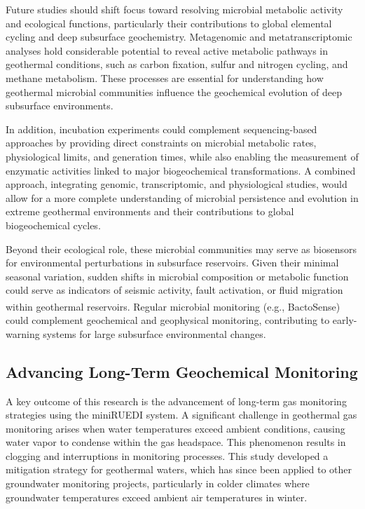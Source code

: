 Future studies should shift focus toward resolving microbial metabolic activity and ecological functions, particularly their contributions to global elemental cycling and deep subsurface geochemistry.
Metagenomic and metatranscriptomic analyses hold considerable potential to reveal active metabolic pathways in geothermal conditions, such as carbon fixation, sulfur and nitrogen cycling, and methane metabolism.
These processes are essential for understanding how geothermal microbial communities influence the geochemical evolution of deep subsurface environments.

In addition, incubation experiments could complement sequencing-based approaches by providing direct constraints on microbial metabolic rates, physiological limits, and generation times, while also enabling the measurement of enzymatic activities linked to major biogeochemical transformations.
A combined approach, integrating genomic, transcriptomic, and physiological studies, would allow for a more complete understanding of microbial persistence and evolution in extreme geothermal environments and their contributions to global biogeochemical cycles.

Beyond their ecological role, these microbial communities may serve as biosensors for environmental perturbations in subsurface reservoirs.
Given their minimal seasonal variation, sudden shifts in microbial composition or metabolic function could serve as indicators of seismic activity, fault activation, or fluid migration within geothermal reservoirs.
Regular microbial monitoring (e.g., BactoSense\textsuperscript{\tiny\textregistered}) could complement geochemical and geophysical monitoring, contributing to early-warning systems for large subsurface environmental changes.

\subsection*{Advancing Long-Term Geochemical Monitoring}
A key outcome of this research is the advancement of long-term gas monitoring strategies using the miniRUEDI system.
A significant challenge in geothermal gas monitoring arises when water temperatures exceed ambient conditions, causing water vapor to condense within the gas headspace.
This phenomenon results in clogging and interruptions in monitoring processes.
This study developed a mitigation strategy for geothermal waters, which has since been applied to other groundwater monitoring projects, particularly in colder climates where groundwater temperatures exceed ambient air temperatures in winter.

